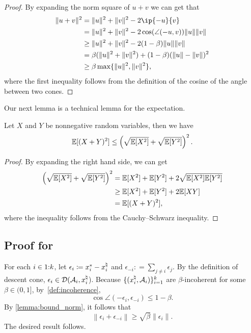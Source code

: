 \begin{proof}
    By expanding the norm square of $u + v$ we can get that 
      \begin{align*}
        \|u + v\|^2 &= \|u\|^2 + \|v\|^2 - 2\ip{-u}{v}
        \\&= \|u\|^2 + \|v\|^2 - 2\cos(\angle(-u, v))\|u\|\|v\|
        \\&\geq \|u\|^2 + \|v\|^2 - 2(1-\beta)\|u\|\|v\|
        \\&= \beta(\|u\|^2 + \|v\|^2) + (1-\beta)(\|u\| - \|v\|)^2
        \\&\geq \beta\max\{\|u\|^2, \|v\|^2\},
      \end{align*}
    where the first inequality follows from the definition of the cosine of the angle between two cones. 
\end{proof}

Our next lemma is a technical lemma for the expectation.

\begin{lemma}\label{lemma:expectation}
    Let $X$ and $Y$ be nonnegative random variables, then we have 
    \[\mathbb{E}[(X+Y)^2] \leq \left( \sqrt{\mathbb{E}[X^2]} + \sqrt{\mathbb{E}[Y^2]} \right)^2.\]
\end{lemma}

\begin{proof}
    By expanding the right hand side, we can get
    \begin{align*}
      \left( \sqrt{\mathbb{E}[X^2]} + \sqrt{\mathbb{E}[Y^2]} \right)^2 &= \mathbb{E}[X^2] + \mathbb{E}[Y^2] + 2\sqrt{\mathbb{E}[X^2]\mathbb{E}[Y^2]}
      \\&\geq \mathbb{E}[X^2] + \mathbb{E}[Y^2] + 2\mathbb{E}[XY]
      \\&= \mathbb{E}[(X+Y)^2],
    \end{align*}
    where the inequality follows from the Cauchy–Schwarz inequality.
\end{proof}

\subsection{Proof for } \label{sec:proof-thm-stability}
For each $i\in1\mathord{:}k$, let $\epsilon_i \coloneqq  x_i^* - x_i^{\natural}$ and $\epsilon_{-i} : = \sum_{j \neq i}\epsilon_j$. By the definition of descent cone,
$\epsilon_i \in \mathcal{D}(\mathcal{A}_i, x_i^{\natural}$).
Because $\{(x_i^{\natural}, \mathcal{A}_i)\}_{i=1}^k$ are $\beta$-incoherent for some $\beta\in(0,1]$, by~\autoref{def:incoherence},
\[\cos\angle\left(-\epsilon_i, \epsilon_{-i}\right) \leq 1 - \beta.\]
By \autoref{lemma:bound_norm}, it follows that
\[ \left\|\epsilon_i + \epsilon_{-i}\right\| \geq \sqrt{\beta}\|\epsilon_i\|.\]
The desired result follows.

